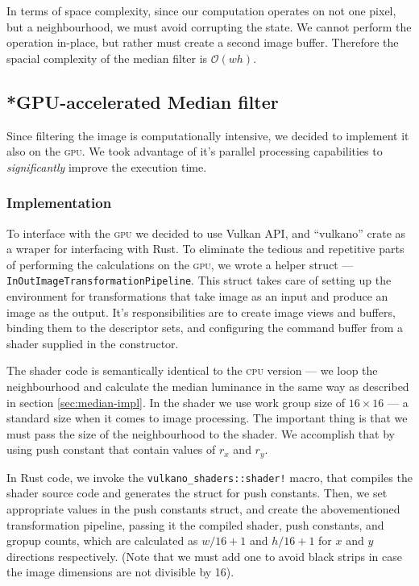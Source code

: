\documentclass[12pt]{article}
\theoremstyle{definition}
\begin{document}
In terms of space complexity, since our computation operates on not one pixel, but a neighbourhood, we must avoid corrupting the state.
We cannot perform the operation in-place, but rather must create a second image buffer.
Therefore the spacial complexity of the median filter is $\mathcal{O}(wh)$.

\subsection{*GPU-accelerated Median filter}

Since filtering the image is computationally intensive, we decided to implement it also on the \textsc{gpu}.
We took advantage of it's parallel processing capabilities to \emph{significantly} improve the execution time.

\subsubsection{Implementation}\label{sec:median-gpu-impl}

To interface with the \textsc{gpu} we decided to use Vulkan API,
and ``vulkano'' crate as a wraper for interfacing with Rust.
To eliminate the tedious and repetitive parts of performing the calculations on the \textsc{gpu},
we wrote a helper struct --- \lstinline{InOutImageTransformationPipeline}.
This struct takes care of setting up the environment for transformations that take image as an input and produce an image as the output.
It's responsibilities are to create image views and buffers, binding them to the descriptor sets, and configuring the command buffer from a shader supplied in the constructor.

The shader code is semantically identical to the \textsc{cpu} version ---
we loop the neighbourhood and calculate the median luminance in the same way as described in section \ref{sec:median-impl}.
In the shader we use work group size of $16\times16$ --- a standard size when it comes to image processing.
The important thing is that we must pass the size of the neighbourhood to the shader.
We accomplish that by using push constant that contain values of $r_x$ and $r_y$.

In Rust code, we invoke the \lstinline{vulkano_shaders::shader!} macro, that compiles the shader source code and generates the struct for push constants.
Then, we set appropriate values in the push constants struct, and create the abovementioned transformation pipeline,
passing it the compiled shader, push constants, and gropup counts, which are calculated as $w / 16 + 1$ and $h / 16 + 1$ for $x$ and $y$ directions respectively.
(Note that we must add one to avoid black strips in case the image dimensions are not divisible by 16).
\end{document}
